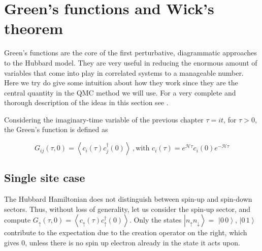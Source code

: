 \section{Green's functions and Wick's theorem}\label{sec:green}

Green's functions are the core of the first perturbative, diagrammatic approaches to the Hubbard model.
They are very useful in reducing the enormous amount of variables that come into play in correlated systems to a manageable number.
Here we try do give some intuition about how they work since they are the central quantity in the \acs{QMC} method we will use.
For a very complete and thorough description of the ideas in this section see \cite{fetter_quantum_2003}.

Considering the imaginary-time variable of the previous chapter $\tau = i t$, for $\tau > 0$, the Green's function is defined as

\begin{equation}
G_{i  j} ( \tau, 0 ) = \left\langle c_{i} ( \tau ) c_{j}^\dagger ( 0 ) \right\rangle  \, , \text{with} \,\, c_{i} ( \tau ) = e^{\mathcal{H} \tau } c_{i} ( 0 ) e^{- \mathcal{H} \tau } 
\end{equation}

\subsection{Single site case}

The Hubbard Hamiltonian does not distinguish between spin-up and spin-down sectors.
Thus, without loss of generality, let us consider the spin-up sector, and compute $G_\uparrow (\tau, 0) =  \left\langle c_{\uparrow} ( \tau) c_{\uparrow}^\dagger ( 0 ) \right\rangle$.
Only the states $\left| n_{\uparrow} n_{\downarrow} \right\rangle = $ $\left| 0\, 0 \right\rangle$, $\left| 0\, 1 \right\rangle$ contribute to the expectation due to the creation operator on the right, which gives 0, unless there is no spin up electron already in the state it acts upon.

